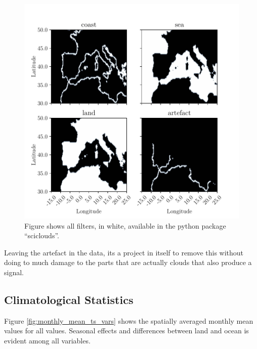 \begin{figure}
    \centering
    \includegraphics{python_figs/filters.pdf}
    \caption{Figure shows all filters, in white, available in the python package ``sciclouds''.}
    \label{fig:filters_subplot}
\end{figure}

Leaving the artefact in the data, its a project in itself to remove this without doing to much damage to the parts that are actually clouds that also produce a signal.

\subsection{Climatological Statistics}
Figure \ref{fig:monthly_mean_ts_vars} shows the spatially averaged monthly mean values for all values. Seasonal effects and differences between land and ocean is evident among all variables.

